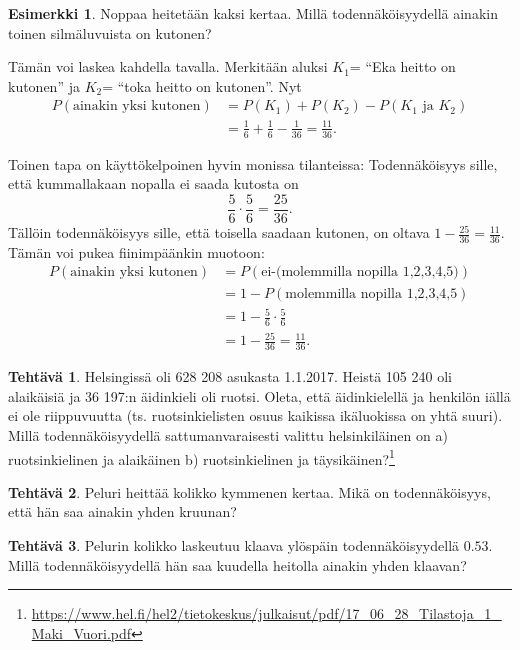 \documentclass[12pt,leqno,a4paper,oneside]{amsart}
\theoremstyle{definition}
\newtheorem{example}[proclaim]{Esimerkki}
\newtheorem{exercise}{Tehtävä}
\theoremstyle{remark}
\numberwithin{equation}{section}
\begin{document}
\begin{example}
 Noppaa heitetään kaksi kertaa. Millä todennäköisyydellä ainakin toinen silmäluvuista on kutonen?
 
 Tämän voi laskea kahdella tavalla. Merkitään aluksi $K_1$= ``Eka heitto on kutonen'' ja $K_2$= ``toka heitto on kutonen''.
 Nyt
 \begin{align*}
  P(\text{ainakin yksi kutonen} ) &= P(K_1) + P(K_2) - P(K_1 \text{ ja } K_2 )\\
  &= \frac{1}{6} + \frac{1}{6} - \frac{1}{36} = \frac{11}{36} .
 \end{align*}
 
 Toinen tapa on käyttökelpoinen hyvin monissa tilanteissa:
 Todennäköisyys sille, että kummallakaan nopalla ei saada kutosta on 
 $$\frac{5}{6}\cdot\frac{5}{6} = \frac{25}{36} .$$
 Tällöin todennäköisyys sille, että toisella saadaan kutonen, on oltava $1-\frac{25}{36} = \frac{11}{36} .$
 Tämän voi pukea fiinimpäänkin muotoon:
 \begin{align*}
  P(\text{ainakin yksi kutonen} ) &= P(\text{ei-(molemmilla nopilla 1,2,3,4,5)} )\\
  &= 1-P(\text{molemmilla nopilla 1,2,3,4,5} ) \\
  &= 1- \frac{5}{6}\cdot \frac{5}{6} \\
  &= 1- \frac{25}{36} = \frac{11}{36} .
 \end{align*}
 
\end{example}

\begin{exercise}
Helsingissä oli 628 208 asukasta 1.1.2017. Heistä 105 240 oli alaikäisiä ja 36 197:n äidinkieli oli ruotsi. Oleta, että äidinkielellä
ja henkilön iällä ei ole riippuvuutta (ts. ruotsinkielisten osuus kaikissa ikäluokissa on yhtä suuri). 
Millä todennäköisyydellä sattumanvaraisesti valittu helsinkiläinen on a) ruotsinkielinen ja alaikäinen
b) ruotsinkielinen ja täysikäinen?\footnote{\url{https://www.hel.fi/hel2/tietokeskus/julkaisut/pdf/17_06_28_Tilastoja_1_Maki_Vuori.pdf}} 
\end{exercise}

\begin{exercise}
 Peluri heittää kolikko kymmenen kertaa. Mikä on toden\-näköisyys, että hän saa ainakin yhden kruunan?
\end{exercise}

\begin{exercise}
 Pelurin kolikko laskeutuu klaava ylöspäin todennäköisyydellä $0.53$. Millä toden\-näköisyydellä hän saa kuudella heitolla ainakin yhden klaavan?
\end{exercise}
\end{document}
